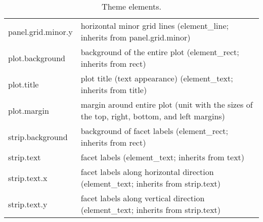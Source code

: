 \begin{table}[ht]
\begin{tabular}{ll}
  panel.grid.minor.y & horizontal minor grid lines (element\_line; inherits from panel.grid.minor) \\ 
  plot.background & background of the entire plot (element\_rect; inherits from rect) \\ 
  plot.title & plot title (text appearance) (element\_text; inherits from title) \\ 
  plot.margin & margin around entire plot (unit with the sizes of the top, right, bottom, and left margins) \\ 
  strip.background & background of facet labels (element\_rect; inherits from rect) \\ 
  strip.text & facet labels (element\_text; inherits from text) \\ 
  strip.text.x & facet labels along horizontal direction (element\_text; inherits from strip.text) \\ 
  strip.text.y & facet labels along vertical direction (element\_text; inherits from strip.text) \\ 
   \hline
\end{tabular}
\caption{Theme elements.} 
\label{elements}
\end{table}
